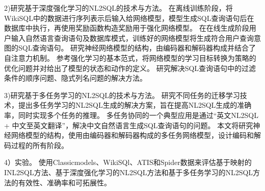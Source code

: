 2)研究基于深度强化学习的NL2SQL的技术与方法。
在离线训练阶段，将WikiSQL中的数据进行序列表示后输入给网络模型，模型生成SQL查询语句后在数据库中执行，再使用奖励函数构造奖励用于强化网络模型。
在在线生成阶段用户输入自然语言查询语句及数据库模式，训练好的网络模型将生成符合用户查询意图的SQL查询语句。
研究神经网络模型的结构，由编码器和解码器构成并结合了自注意力机制。
参考强化学习的基本范式，将网络模型的学习目标转换为策略的优化问题并对给出了模型的状态和动作的定义。
研究解决SQL查询语句中的过滤条件的顺序问题、隐式列名问题的解决方法。

3)研究基于多任务学习的NL2SQL的技术与方法。
研究不同任务的迁移学习技术，提出多任务学习的NL2SQL生成的解决方案，旨在提高NL2SQL生成的准确率，同时实现多个任务的推理。
多任务协同的一个典型应用是通过“英文NL2SQL + 中文至英文翻译”，解决中文自然语言生成SQL查询语句的问题。
本文将研究神经网络模型的结构，使用由编码器和解码器构成的多任务网络模型，设计编码和解码过程的所有阶段。

4）实验。
使用Classicmodels、WikiSQl、ATIS和Spider数据来评估基于映射的INL2SQL方法、基于深度强化学习的NL2SQL方法和基于多任务学习的NL2SQL方法的有效性、准确率和可拓展性。


